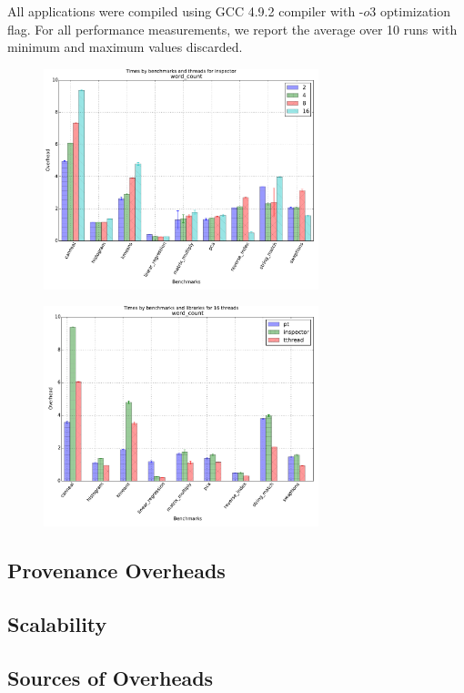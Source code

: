 

 All applications were compiled using GCC 4.9.2 compiler with -$o3$ optimization flag. For all performance measurements, we report the average over 10 runs with minimum and maximum values discarded.



\begin{figure}[h]
\includegraphics[width=8cm]{figure/benchmarks-inspector.pdf}
\end{figure}

\begin{figure}[h]
\includegraphics[width=8cm]{figure/benchmarks-16.pdf}
\end{figure}

%

\subsection{Provenance Overheads}



\subsection{\projecttitle Scalability}




\subsection{Sources of Overheads}





